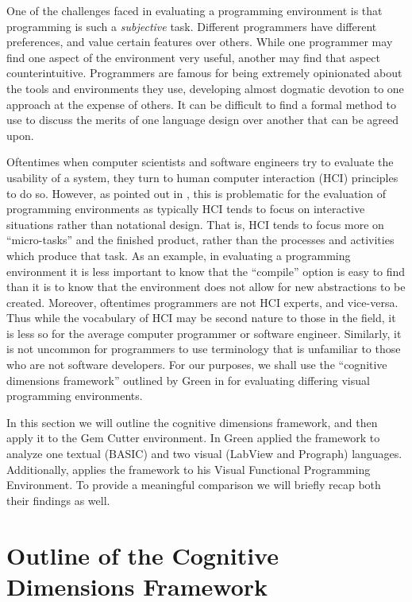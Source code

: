 \label{chapter:Exp}

One of the challenges faced in evaluating a programming environment is that programming is such a \textit{subjective}
task.  Different programmers have different preferences, and value certain features over others.  While one
programmer may find one aspect of the environment very useful, another may find that aspect counterintuitive.  
Programmers are famous for being extremely opinionated about the tools and environments they use, developing almost
dogmatic devotion to one approach at the expense of others.  It can be difficult to find a formal method to
use to discuss the merits of one language design over another that can be agreed upon.

Oftentimes when computer scientists and software engineers try to evaluate the usability of a system, they turn
to human computer interaction (HCI) principles to do so.  However, as pointed out in \cite{green96}, this is 
problematic for the evaluation of programming environments as typically HCI tends to focus on interactive situations
rather than notational design.  That is, HCI tends to focus more on ``micro-tasks'' and the finished product, rather
than the processes and activities which produce that task.  As an example, in evaluating a programming environment it is less important
to know that the ``compile'' option is easy to find than it is to know that the environment does not allow for new 
abstractions to be created.  Moreover, oftentimes programmers are not HCI experts, and
vice-versa.  Thus while the vocabulary of HCI may be second nature to those in the field, it is less so for the
average computer programmer or software engineer.  Similarly, it is not uncommon for programmers to use terminology
that is unfamiliar to those who are not software developers.  For our purposes, we shall use the ``cognitive dimensions 
framework'' outlined by Green in \cite{green96} for evaluating differing visual programming environments.  

In this section we will outline the cognitive dimensions framework, and then apply it to the Gem Cutter environment.  
In \cite{green96} Green applied the framework to analyze one textual (BASIC) and two visual (LabView and Prograph) 
languages.  Additionally, \cite{Kelso02} applies the framework to his Visual Functional Programming Environment.  To 
provide a meaningful comparison we will briefly recap both their findings as well.

\section{Outline of the Cognitive Dimensions Framework}
\label{cgframeoutline}

